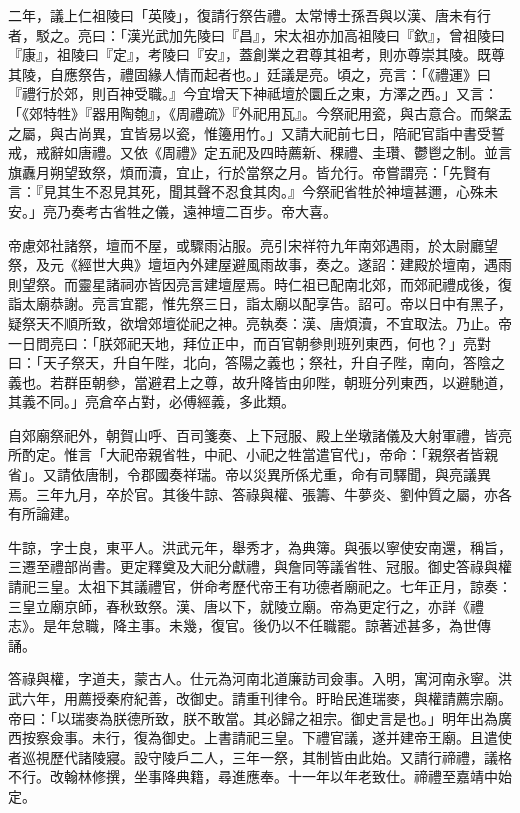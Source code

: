 \begin{pinyinscope}
二年，議上仁祖陵曰「英陵」，復請行祭告禮。太常博士孫吾與以漢、唐未有行者，駁之。亮曰：「漢光武加先陵曰『昌』，宋太祖亦加高祖陵曰『欽』，曾祖陵曰『康』，祖陵曰『定』，考陵曰『安』，蓋創業之君尊其祖考，則亦尊崇其陵。既尊其陵，自應祭告，禮固緣人情而起者也。」廷議是亮。頃之，亮言：「《禮運》曰『禮行於郊，則百神受職。』今宜增天下神祗壇於圜丘之東，方澤之西。」又言：「《郊特牲》『器用陶匏』，《周禮疏》『外祀用瓦』。今祭祀用瓷，與古意合。而槃盂之屬，與古尚異，宜皆易以瓷，惟籩用竹。」又請大祀前七日，陪祀官詣中書受誓戒，戒辭如唐禮。又依《周禮》定五祀及四時薦新、稞禮、圭瓚、鬱鬯之制。並言旗纛月朔望致祭，煩而瀆，宜止，行於當祭之月。皆允行。帝嘗謂亮：「先賢有言：『見其生不忍見其死，聞其聲不忍食其肉。』今祭祀省牲於神壇甚邇，心殊未安。」亮乃奏考古省牲之儀，遠神壇二百步。帝大喜。

帝慮郊社諸祭，壇而不屋，或驟雨沾服。亮引宋祥符九年南郊遇雨，於太尉廳望祭，及元《經世大典》壇垣內外建屋避風雨故事，奏之。遂詔：建殿於壇南，遇雨則望祭。而靈星諸祠亦皆因亮言建壇屋焉。時仁祖已配南北郊，而郊祀禮成後，復詣太廟恭謝。亮言宜罷，惟先祭三日，詣太廟以配享告。詔可。帝以日中有黑子，疑祭天不順所致，欲增郊壇從祀之神。亮執奏：漢、唐煩瀆，不宜取法。乃止。帝一日問亮曰：「朕郊祀天地，拜位正中，而百官朝參則班列東西，何也？」亮對曰：「天子祭天，升自午陛，北向，答陽之義也；祭社，升自子陛，南向，答陰之義也。若群臣朝參，當避君上之尊，故升降皆由卯陛，朝班分列東西，以避馳道，其義不同。」亮倉卒占對，必傅經義，多此類。

自郊廟祭祀外，朝賀山呼、百司箋奏、上下冠服、殿上坐墩諸儀及大射軍禮，皆亮所酌定。惟言「大祀帝親省牲，中祀、小祀之牲當遣官代」，帝命：「親祭者皆親省」。又請依唐制，令郡國奏祥瑞。帝以災異所係尤重，命有司驛聞，與亮議異焉。三年九月，卒於官。其後牛諒、答祿與權、張籌、牛夢炎、劉仲質之屬，亦各有所論建。

牛諒，字士良，東平人。洪武元年，舉秀才，為典簿。與張以寧使安南還，稱旨，三遷至禮部尚書。更定釋奠及大祀分獻禮，與詹同等議省牲、冠服。御史答祿與權請祀三皇。太祖下其議禮官，併命考歷代帝王有功德者廟祀之。七年正月，諒奏：三皇立廟京師，春秋致祭。漢、唐以下，就陵立廟。帝為更定行之，亦詳《禮志》。是年怠職，降主事。未幾，復官。後仍以不任職罷。諒著述甚多，為世傳誦。

答祿與權，字道夫，蒙古人。仕元為河南北道廉訪司僉事。入明，寓河南永寧。洪武六年，用薦授秦府紀善，改御史。請重刊律令。盱眙民進瑞麥，與權請薦宗廟。帝曰：「以瑞麥為朕德所致，朕不敢當。其必歸之祖宗。御史言是也。」明年出為廣西按察僉事。未行，復為御史。上書請祀三皇。下禮官議，遂并建帝王廟。且遣使者巡視歷代諸陵寢。設守陵戶二人，三年一祭，其制皆由此始。又請行禘禮，議格不行。改翰林修撰，坐事降典籍，尋進應奉。十一年以年老致仕。禘禮至嘉靖中始定。


\end{pinyinscope}
